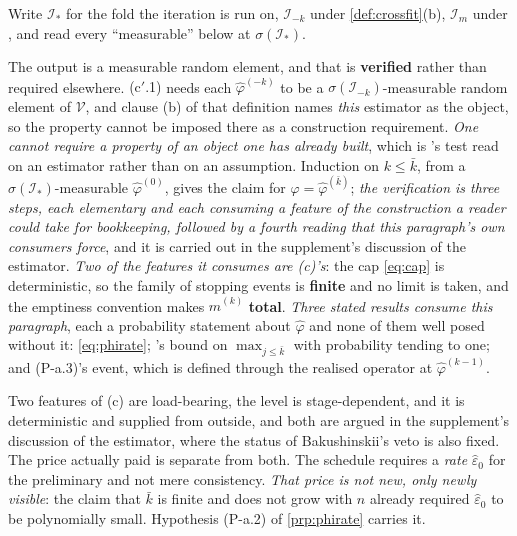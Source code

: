 \begin{definition}
Write $\mathcal I_\ast$ for the fold the iteration is run on, $\mathcal I_{-k}$ under
\cref{def:crossfit}\textup{(b)}, $\mathcal I_m$ under , and read every ``measurable''
below at $\sigma(\mathcal I_\ast)$.

The output is a measurable random element, and that is \textbf{verified} rather than required
elsewhere. \textup{(c$'$.1)} needs each $\hat\varphi^{(-k)}$ to be a
$\sigma(\mathcal I_{-k})$-measurable random element of $\mathcal V$, and clause \textup{(b)} of that
definition names \emph{this} estimator as the object, so the property cannot be imposed there as a
construction requirement. \emph{One cannot require a property of an object one has already built}, which is
's test read on an estimator rather than on an assumption. Induction on
$k\le\bar k$, from a $\sigma(\mathcal I_\ast)$-measurable $\hat\varphi^{(0)}$, gives the claim for
$\hat\varphi=\hat\varphi^{(\bar k)}$; \emph{the verification is three steps, each elementary and each
consuming a feature of the construction a reader could take for bookkeeping, followed by a fourth reading
that this paragraph's own consumers force}, and it is carried out in the supplement's discussion of the
estimator. \emph{Two of the features it consumes are \textup{(c)}'s}: the cap \eqref{eq:cap} is
deterministic, so the family of stopping events is \textbf{finite} and no limit is taken, and the emptiness
convention makes $\hat m^{(k)}$ \textbf{total}. \emph{Three stated results consume this paragraph}, each a
probability statement about $\hat\varphi$ and none of them well posed without it: \eqref{eq:phirate};
's bound on $\max_{j\le\bar k}$ with probability tending to one; and (P-a.3)'s
event, which is defined through the realised operator at $\hat\varphi^{(k-1)}$.

Two features of \textup{(c)} are load-bearing, the level is stage-dependent, and it is
deterministic and supplied from outside, and both are argued in the supplement's discussion of the
estimator, where the status of Bakushinskii's veto is also fixed. The price actually paid is
separate from both. The schedule requires a \emph{rate}
$\hat\varepsilon_0$ for the preliminary and not mere consistency. \emph{That price is not new, only
newly visible}: the claim that $\bar k$ is finite and does not grow with $n$ already required
$\hat\varepsilon_0$ to be polynomially small. Hypothesis (P-a.2) of \cref{prp:phirate} carries it.


\end{definition}
